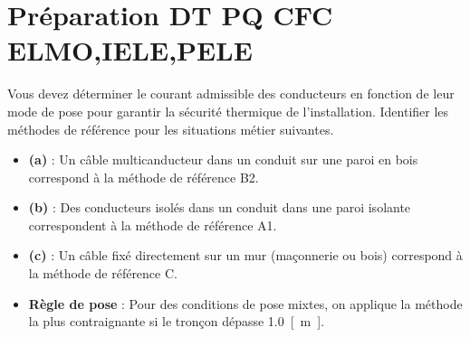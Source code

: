 \documentclass[a4paper,11pt,answers,addpoints]{exam}
\begin{document}
	\unframedsolutions
	\pointsinmargin
	\bracketedpoints
	
\section*{Préparation DT PQ CFC ELMO,IELE,PELE}
\begin{questions}
\question
Vous devez déterminer le courant admissible des conducteurs en fonction de leur mode de pose pour garantir la sécurité thermique de l'installation. Identifier les méthodes de référence pour les situations métier suivantes.


\begin{solution}

	\begin{itemize}
		\item \textbf{(a)} : Un câble multicanducteur dans un conduit sur une paroi en bois correspond à la méthode de référence B2.
		\item \textbf{(b)} : Des conducteurs isolés dans un conduit dans une paroi isolante correspondent à la méthode de référence A1.
		\item \textbf{(c)} : Un câble fixé directement sur un mur (maçonnerie ou bois) correspond à la méthode de référence C.
		\item \textbf{Règle de pose} : Pour des conditions de pose mixtes, on applique la méthode la plus contraignante si le tronçon dépasse \qty{1,0}{[\metre]}.
	\end{itemize}
	

\end{solution}
\end{questions}
\end{document}
